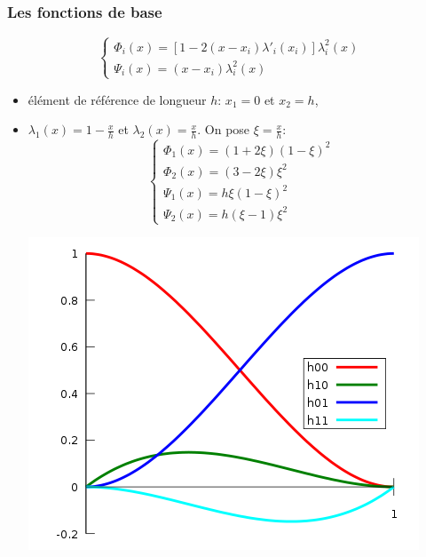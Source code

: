 \documentclass{beamer}
\begin{document}
\begin{frame}
\frametitle{Les fonctions de base}
\[\left\{\begin{array}{l}
\Phi_i(x) = \left[1-2(x-x_i)\lambda'_i(x_i)\right]\lambda^2_i(x) \\
\Psi_i(x) = (x-x_i)\lambda^2_i(x) 
\end{array}\right.
 \]
 \begin{itemize}
 \item élément de référence de longueur $h$:  $x_1=0$ et $x_2=h$, 
 \item $\lambda_1(x)=1-\frac{x}{h}$ et $\lambda_2(x)=\frac{x}{h}$. On pose $\xi= \frac{x}{h}$:
 \[\left\{\begin{array}{l}
\Phi_1(x) = (1+2\xi)(1-\xi)^2 \\
\Phi_2(x) = (3-2\xi)\xi^2 \\
\Psi_1(x) = h \xi(1-\xi)^2\\
\Psi_2(x) = h (\xi-1)\xi^2
\end{array}\right.
 \]
 \begin{center}
\includegraphics[scale=0.25]{HermiteBasis.png} 
\end{center}
 \end{itemize}

\end{frame}



\end{document}
